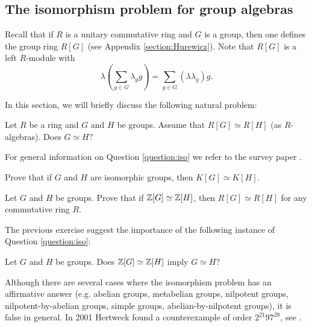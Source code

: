 \subsection{The isomorphism problem for group algebras}


Recall that if $R$ is a unitary commutative ring 
and $G$ is a group, then one defines the group ring $R[G]$ (see Appendix \ref{section:Hurewicz}). 
Note that $R[G]$ is a left $R$-module with
\[
\lambda\left(\sum_{g\in G}\lambda_gg\right)=\sum_{g\in G}(\lambda\lambda_g)g.
\]

In this section, we will briefly discuss the
following natural problem: 

\begin{question}
\label{question:iso}
 Let $R$ be a ring and $G$ and $H$ be groups. Assume
 that $R[G]\simeq R[H]$ (as $R$-algebras). Does $G\simeq H$?
\end{question}

For general information on Question \ref{question:iso} we refer to the survey paper \cite{MR4472590}.

\begin{exercise}
    Prove that if $G$ and $H$ are isomorphic groups, then $K[G]\simeq K[H]$.
\end{exercise}

\begin{exercise}
    Let $G$ and $H$ be groups. Prove that if
    $\mathbb{Z}[G]\simeq\mathbb{Z}[H]$, then $R[G]\simeq R[H]$ for any commutative ring $R$.
\end{exercise}

The previous exercise suggest the importance of the following 
instance of Question \ref{question:iso}:

\begin{question}
\label{question:IP}
    Let $G$ and $H$ be groups. Does $\mathbb{Z}[G]\simeq\mathbb{Z}[H]$ imply $G\simeq H$?
\end{question}

Although there are several cases where
the isomorphism problem has an affirmative answer (e.g. abelian groups,
metabelian groups, nilpotent groups, nilpotent-by-abelian groups, simple groups,
abelian-by-nilpotent groups), it is false in general. In 2001
Hertweck found a counterexample of order $2^{21}97^{28}$, see \cite{MR1847590}.

